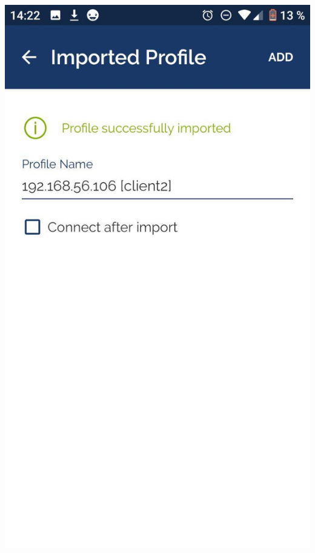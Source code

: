 \documentclass[11pt,a4paper]{article}
\begin{document}
\medskip

\begin{center}
\includegraphics[scale=0.4]{profile-imported.jpg}

\end{center}
\end{document}
